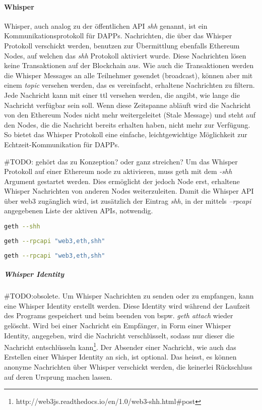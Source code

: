 \paragraph{Whisper}
\label{para:Whisper}
Whisper, auch analog zu der öffentlichen API \emph{shh} genannt, ist ein Kommunikationsprotokoll für \acrfull{DAPPs}. Nachrichten, die über das Whisper Protokoll verschickt werden, benutzen zur Übermittlung ebenfalls Ethereum Nodes, auf welchen das \emph{shh} Protokoll aktiviert wurde. Diese Nachrichten lösen keine Transaktionen auf der Blockchain aus. Wie auch die Transaktionen werden die Whisper Messages an alle Teilnehmer gesendet (broadcast), können aber mit einem \emph{topic} versehen werden, das es vereinfacht, erhaltene Nachrichten zu filtern. Jede Nachricht kann mit einer \acrfull{ttl} versehen werden, die angibt, wie lange die Nachricht verfügbar sein soll. Wenn diese Zeitspanne abläuft wird die Nachricht von den Ethereum Nodes nicht mehr weitergeleitet (Stale Message) und steht auf den Nodes, die die Nachricht bereits erhalten haben, nicht mehr zur Verfügung. So bietet das Whisper Protokoll eine einfache, leichtgewichtige Möglichkeit zur Echtzeit-Kommunikation für \acrshort{DAPPs}.

\#TODO: gehört das zu Konzeption? oder ganz streichen? Um das Whisper Protokoll auf einer Ethereum node zu aktivieren, muss geth mit dem \emph{-shh} Argument gestartet werden. Dies ermöglicht der jedoch Node erst, erhaltene Whisper Nachrichten von anderen Nodes weiterzuleiten. Damit die Whisper API über web3 zugänglich wird, ist zusätzlich der Eintrag \emph{shh}, in der mittels \emph{--rpcapi} angegebenen Liste der aktiven APIs, notwendig.
\begin{lstlisting}[language=bash,caption=Beispiel für die Aktivierung des shh Protokolls auf der Ethereum Node]
geth --shh
\end{lstlisting}
\begin{lstlisting}[language=bash,caption={Beispiel für die Aktivierung der web3, eth und shh API}]
geth --rpcapi "web3,eth,shh"
\end{lstlisting}
\begin{lstlisting}[language=bash,caption={Beispiel für die Aktivierung des shh Protokolls und der web3, eth und shh API}]
geth --rpcapi "web3,eth,shh"
\end{lstlisting}
\subparagraph{Whisper Identity}
\label{supara:Whisper_Identity}
\#TODO:obsolete. Um Whisper Nachrichten zu senden oder zu empfangen, kann eine Whisper Identity erstellt werden. Diese Identity wird während der Laufzeit des Programs gespeichert und beim beenden von bspw. \emph{geth attach} wieder gelöscht. Wird bei einer Nachricht ein Empfänger, in Form einer Whisper Identity, angegeben, wird die Nachricht verschlüsselt, sodass nur dieser die Nachricht entschlüsseln kann\footnote{http://web3js.readthedocs.io/en/1.0/web3-shh.html\#post}. Der Absender einer Nachricht, wie auch das Erstellen einer Whisper Identity an sich, ist optional. Das heisst, es können anonyme Nachrichten über Whisper verschickt werden, die keinerlei Rückschluss auf deren Ursprung machen lassen.

